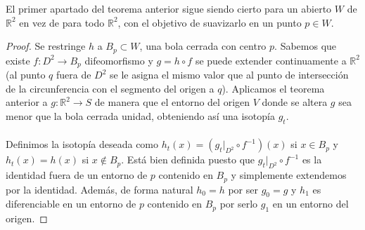 \begin{corolario}
	El primer apartado del teorema anterior sigue siendo cierto para un abierto $W$ de $\mathbb{R}^2$ en vez de para todo $\mathbb{R}^2$, con el objetivo de suavizarlo en un punto $p \in W$.
\end{corolario}

\begin{proof}
	Se restringe $h$ a $B_p \subset W$, una bola cerrada con centro $p$. Sabemos que existe $f: D^2 \rightarrow B_p$ difeomorfismo y $g=h \circ f$ se puede extender continuamente a $\mathbb{R}^2$ (al punto $q$ fuera de $D^2$ se le asigna el mismo valor que al punto de intersección de la circunferencia con el segmento del origen a $q$). Aplicamos el teorema anterior a $g:\mathbb{R}^2 \rightarrow S$ de manera que el entorno del origen $V$ donde se altera $g$ sea menor que la bola cerrada unidad, obteniendo así una isotopía $g_t$.\\
	\\Definimos la isotopía deseada como $h_t(x) = (g_t|_{D^2} \circ f^{-1})(x)$ si $x \in B_p$ y $h_t(x) = h(x)$ si $x \not \in B_p$. Está bien definida puesto que $g_t|_{D^2} \circ f^{-1}$ es la identidad fuera de un entorno de $p$ contenido en $B_p$ y simplemente extendemos por la identidad. Además, de forma natural $h_0 = h$ por ser $g_0 = g$ y $h_1$ es diferenciable en un entorno de $p$ contenido en $B_p$ por serlo $g_1$ en un entorno del origen.
\end{proof}



\endinput
